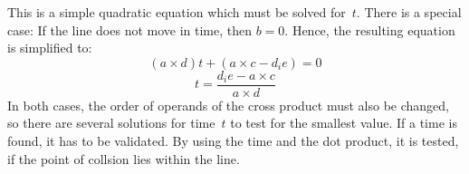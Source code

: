 \documentclass[a4paper,10pt]{scrartcl}
\begin{document}
This is a simple quadratic equation which must be solved for~$t$. There is a
special case: If the line does not move in time, then $b=0$. Hence, the resulting
equation is simplified to:
\begin{equation}
    (a \times d)t + (a \times c - d_i e) = 0
\end{equation}
\begin{equation}
    t = \frac{d_i e -  a \times c}{a \times d}
\end{equation}
In both cases, the order of operands of the cross product must also be changed,
so there are several solutions for time~$t$ to test for the smallest value.
If a time is found, it has to be validated. By using the time and the dot product,
it is tested, if the point of collsion lies within the line.\\
\end{document}
